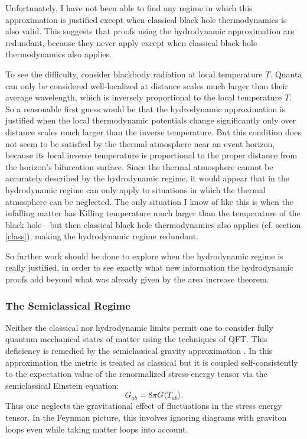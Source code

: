 \documentclass[12pt]{article}
\begin{document}
Unfortunately, I have not been able to find any regime in which this approximation is justified except when classical black hole thermodynamics is also valid.  This suggests that proofs using the hydrodynamic approximation are redundant, because they never apply except when classical black hole thermodynamics also applies.

To see the difficulty, consider blackbody radiation at local temperature $T$.  Quanta can only be considered well-localized at distance scales much larger than their average wavelength, which is inversely proportional to the local temperature $T$.  So a reasonable first guess would be that the hydrodynamic approximation is justified when the local thermodynamic potentials change significantly only over distance scales much larger than the inverse temperature.  But this condition does not seem to be satisfied by the thermal atmosphere near an event horizon, because its local inverse temperature is proportional to the proper distance from the horizon's bifurcation surface.  Since the thermal atmosphere cannot be accurately described by the hydrodynamic regime, it would appear that in the hydrodynamic regime can only apply to situations in which the thermal atmosphere can be neglected.  The only situation I know of like this is when the infalling matter has Killing temperature much larger than the temperature of the black hole---but then classical black hole thermodynamics also applies (cf. section \ref{class}), making the hydrodynamic regime redundant.

So further work should be done to explore when the hydrodynamic regime is really justified, in order to see exactly what new information the hydrodynamic proofs add beyond what was already given by the area increase theorem.

\subsubsection{The Semiclassical Regime}\label{SC}

Neither the classical nor hydrodynamic limits permit one to consider fully quantum mechanical states of matter using the techniques of QFT.  This deficiency is remedied by the semiclassical gravity approximation \cite{bardeen81}.  In this approximation the metric is treated as classical but it is coupled self-consistently to the expectation value of the renormalized stress-energy tensor via the semiclassical Einstein equation:
\begin{equation}\label{semiEin}
G_{ab} = 8\pi G \langle T_{ab} \rangle.
\end{equation}
Thus one neglects the gravitational effect of fluctuations in the stress energy tensor.  In the Feynman picture, this involves ignoring diagrams with graviton loops even while taking matter loops into account.
\end{document}
